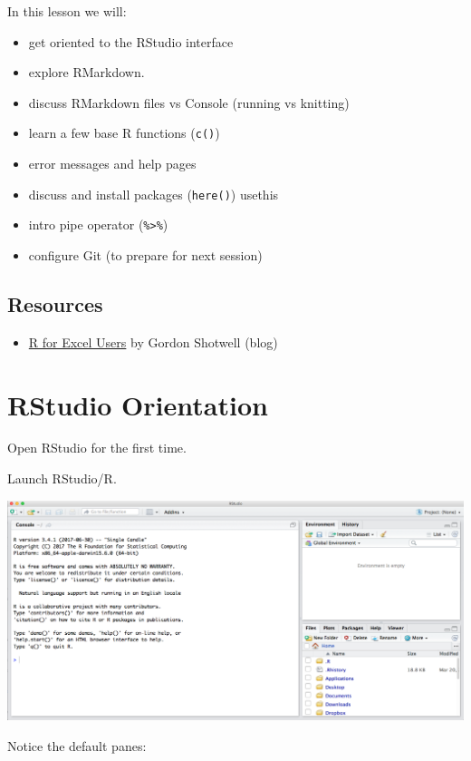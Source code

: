 \documentclass[]{book}
\providecommand{\tightlist}{%
  \setlength{\itemsep}{0pt}\setlength{\parskip}{0pt}}
\begin{document}
In this lesson we will:

\begin{itemize}
\tightlist
\item
  get oriented to the RStudio interface
\item
  explore RMarkdown.
\item
  discuss RMarkdown files vs Console (running vs knitting)
\item
  learn a few base R functions (\texttt{c()})
\item
  error messages and help pages
\item
  discuss and install packages (\texttt{here()}) usethis
\item
  intro pipe operator (\texttt{\%\textgreater{}\%})
\item
  configure Git (to prepare for next session)
\end{itemize}

\hypertarget{resources-1}{%
\subsection{Resources}\label{resources-1}}

\begin{itemize}
\tightlist
\item
  \href{https://blog.shotwell.ca/posts/r_for_excel_users/}{R for Excel Users} by Gordon Shotwell (blog)
\end{itemize}

\hypertarget{rstudio-orientation}{%
\section{RStudio Orientation}\label{rstudio-orientation}}

Open RStudio for the first time.

Launch RStudio/R.

\includegraphics[width=0.8\linewidth]{img/RStudio_IDE}

Notice the default panes:
\end{document}

